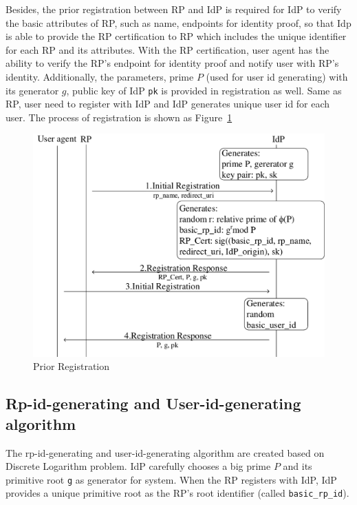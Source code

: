 Besides, the prior registration between RP and IdP is required for IdP to verify the basic attributes of RP, such as name, endpoints for identity proof, so that Idp is able to provide the RP certification to RP which includes the unique identifier for each RP and its attributes. With the RP certification, user agent has the ability to verify the RP's endpoint for identity proof and notify user with RP's identity. Additionally, the parameters, prime $P$ (used for user id generating) with its generator $g$, public key of IdP \verb+pk+ is provided in registration as well. Same as RP, user need to register with IdP and IdP generates unique user id for each user. The process of registration is shown as Figure~\ref{fig:registration}
\begin{figure}
  \centering
  \includegraphics[width=\linewidth]{fig/registration.pdf}
  \caption{Prior Registration}
  \label{fig:registration}
\end{figure}



\subsection{Rp-id-generating and User-id-generating algorithm}
The rp-id-generating and user-id-generating algorithm are created based on Discrete Logarithm problem\cite{shiu2007cryptography:}.
IdP carefully chooses a big prime $P$ and its primitive root \verb+g+ as generator for system. When the RP registers with IdP, IdP provides a unique primitive root as the RP's root identifier (called \verb+basic_rp_id+). 

